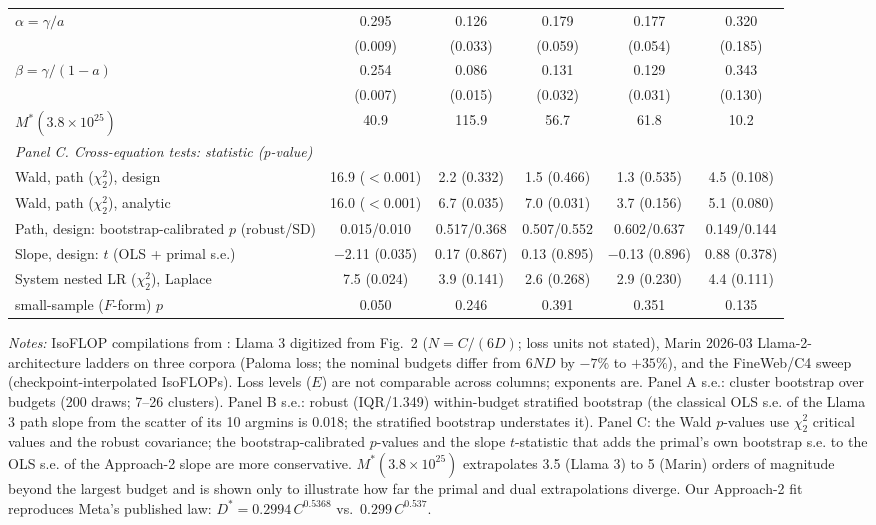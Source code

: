 \begin{table}[!htbp]
\begin{threeparttable}
\begin{tabular}{lccccc}
$\alpha=\gamma/a$ & 0.295 & 0.126 & 0.179 & 0.177 & 0.320 \\
 & (0.009) & (0.033) & (0.059) & (0.054) & (0.185) \\
$\beta=\gamma/(1-a)$ & 0.254 & 0.086 & 0.131 & 0.129 & 0.343 \\
 & (0.007) & (0.015) & (0.032) & (0.031) & (0.130) \\
$M^*(3.8\times10^{25})$ & 40.9 & 115.9 & 56.7 & 61.8 & 10.2 \\
\multicolumn{6}{l}{\textit{Panel C. Cross-equation tests: statistic (p-value)}} \\
Wald, path ($\chi^2_2$), design & 16.9 ($<$0.001) & 2.2 (0.332) & 1.5 (0.466) & 1.3 (0.535) & 4.5 (0.108) \\
Wald, path ($\chi^2_2$), analytic & 16.0 ($<$0.001) & 6.7 (0.035) & 7.0 (0.031) & 3.7 (0.156) & 5.1 (0.080) \\
Path, design: bootstrap-calibrated $p$ (robust/SD) & 0.015/0.010 & 0.517/0.368 & 0.507/0.552 & 0.602/0.637 & 0.149/0.144 \\
Slope, design: $t$ (OLS + primal s.e.) & $-$2.11 (0.035) & 0.17 (0.867) & 0.13 (0.895) & $-$0.13 (0.896) & 0.88 (0.378) \\
System nested LR ($\chi^2_2$), Laplace & 7.5 (0.024) & 3.9 (0.141) & 2.6 (0.268) & 2.9 (0.230) & 4.4 (0.111) \\
\quad small-sample ($F$-form) $p$ & 0.050 & 0.246 & 0.391 & 0.351 & 0.135 \\
\bottomrule
\end{tabular}
\begin{tablenotes}[flushleft]
\footnotesize
\item \textit{Notes:} IsoFLOP compilations from \citet{czech2026problems}: Llama 3 digitized from \citet{grattafiori2024llama} Fig.~2 ($N=C/(6D)$; loss units not stated), Marin 2026-03 Llama-2-architecture ladders on three corpora (Paloma loss; the nominal budgets differ from $6ND$ by $-7\%$ to $+35\%$), and the \citet{li2025misfitting} FineWeb/C4 sweep (checkpoint-interpolated IsoFLOPs). Loss levels ($E$) are not comparable across columns; exponents are. Panel A s.e.: cluster bootstrap over budgets (200 draws; 7--26 clusters). Panel B s.e.: robust (IQR/1.349) within-budget stratified bootstrap (the classical OLS s.e. of the Llama 3 path slope from the scatter of its 10 argmins is 0.018; the stratified bootstrap understates it). Panel C: the Wald $p$-values use $\chi^2_2$ critical values and the robust covariance; the bootstrap-calibrated $p$-values and the slope $t$-statistic that adds the primal's own bootstrap s.e. to the OLS s.e. of the Approach-2 slope are more conservative. $M^*(3.8\times10^{25})$ extrapolates 3.5 (Llama 3) to 5 (Marin) orders of magnitude beyond the largest budget and is shown only to illustrate how far the primal and dual extrapolations diverge. Our Approach-2 fit reproduces Meta's published law: $D^*=0.2994\,C^{0.5368}$ vs.\ $0.299\,C^{0.537}$.
\end{tablenotes}
\end{threeparttable}
\end{table}
